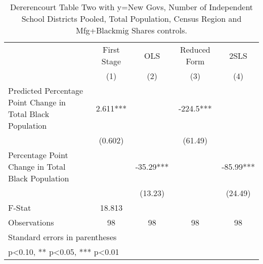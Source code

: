 \begin{table}[htbp]\centering
\def\sym#1{\ifmmode^{#1}\else\(^{#1}\)\fi}
\caption{Dererencourt Table Two with y=New Govs, Number of Independent School Districts  Pooled, Total Population, Census Region and Mfg+Blackmig Shares controls.}
\begin{tabular}{l*{4}{c}}
\toprule
                    & First Stage   &         OLS   &Reduced Form   &        2SLS   \\
                    &\multicolumn{1}{c}{(1)}   &\multicolumn{1}{c}{(2)}   &\multicolumn{1}{c}{(3)}   &\multicolumn{1}{c}{(4)}   \\
\midrule
Predicted Percentage Point Change in Total Black Population&       2.611***&               &      -224.5***&               \\
                    &     (0.602)   &               &     (61.49)   &               \\
\addlinespace
Percentage Point Change in Total Black Population&               &      -35.29***&               &      -85.99***\\
                    &               &     (13.23)   &               &     (24.49)   \\
\midrule
F-Stat              &      18.813   &               &               &               \\
Observations        &          98   &          98   &          98   &          98   \\
\bottomrule
\multicolumn{5}{l}{\footnotesize Standard errors in parentheses}\\
\multicolumn{5}{l}{\footnotesize * p<0.10, ** p<0.05, *** p<0.01}\\
\end{tabular}
\end{table}
